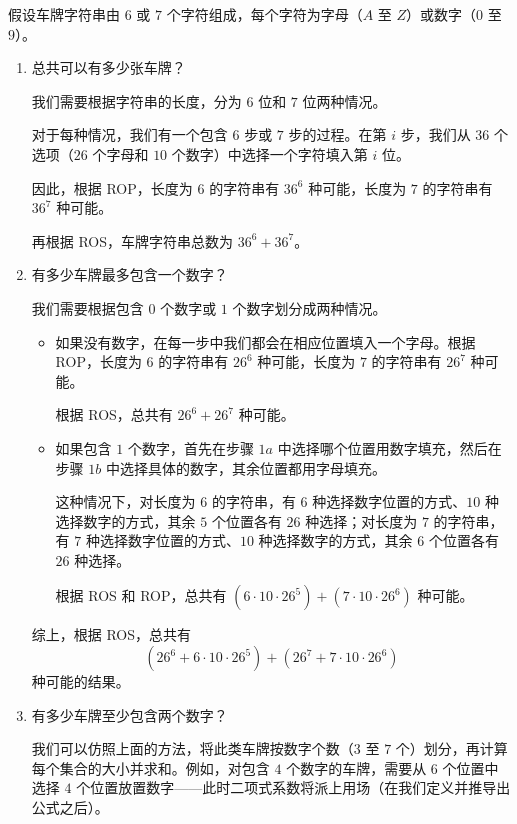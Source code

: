 \begin{example}[车牌]
    假设车牌字符串由 $6$ 或 $7$ 个字符组成，每个字符为字母（$A$ 至 $Z$）或数字（$0$ 至 $9$）。
    \begin{enumerate}[label=(\arabic*)]
        \item 总共可以有多少张车牌？

              我们需要根据字符串的长度，分为 $6$ 位和 $7$ 位两种情况。

              对于每种情况，我们有一个包含 $6$ 步或 $7$ 步的过程。在第 $i$ 步，我们从 $36$ 个选项（$26$ 个字母和 $10$ 个数字）中选择一个字符填入第 $i$ 位。

              因此，根据 ROP，长度为 $6$ 的字符串有 $36^6$ 种可能，长度为 $7$ 的字符串有 $36^7$ 种可能。

              再根据 ROS，车牌字符串总数为 $36^6 + 36^7$。\\
        \item 有多少车牌最多包含一个数字？

              我们需要根据包含 $0$ 个数字或 $1$ 个数字划分成两种情况。
              \begin{itemize}
                  \item 如果没有数字，在每一步中我们都会在相应位置填入一个字母。根据 ROP，长度为 $6$ 的字符串有 $26^6$ 种可能，长度为 $7$ 的字符串有 $26^7$ 种可能。

                        根据 ROS，总共有 $26^6 + 26^7$ 种可能。
                  \item 如果包含 $1$ 个数字，首先在步骤 $1a$ 中选择哪个位置用数字填充，然后在步骤 $1b$ 中选择具体的数字，其余位置都用字母填充。

                        这种情况下，对长度为 $6$ 的字符串，有 $6$ 种选择数字位置的方式、$10$ 种选择数字的方式，其余 $5$ 个位置各有 $26$ 种选择；对长度为 $7$ 的字符串，有 $7$ 种选择数字位置的方式、$10$ 种选择数字的方式，其余 $6$ 个位置各有 $26$ 种选择。
                        
                        根据 ROS 和 ROP，总共有 $(6 \cdot 10 \cdot 26^5) + (7 \cdot 10 \cdot 26^6)$ 种可能。
              \end{itemize}
              综上，根据 ROS，总共有
              \[(26^6 + 6 \cdot 10 \cdot 26^5) + (26^7 + 7 \cdot 10 \cdot 26^6)\]
              种可能的结果。\\
        \item 有多少车牌至少包含两个数字？

              我们可以仿照上面的方法，将此类车牌按数字个数（$3$ 至 $7$ 个）划分，再计算每个集合的大小并求和。例如，对包含 $4$ 个数字的车牌，需要从 $6$ 个位置中选择 $4$ 个位置放置数字——此时二项式系数将派上用场（在我们定义并推导出公式之后）。


\end{enumerate}
\end{example}
